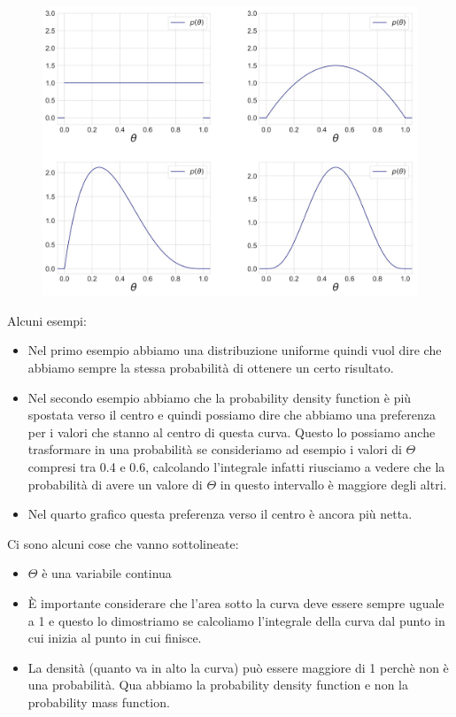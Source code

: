 \documentclass[14pt]{extreport}
\begin{document}
\begin{figure}[H]
\centering
\includegraphics[width=0.7\linewidth]{29.jpeg}
\end{figure}

Alcuni esempi:
\begin{itemize}
\item Nel primo esempio abbiamo una distribuzione uniforme quindi vuol dire che abbiamo sempre la stessa probabilità di ottenere un certo risultato.
\item Nel secondo esempio abbiamo che la probability density function è più spostata verso il centro e quindi possiamo dire che abbiamo una preferenza
per i valori che stanno al centro di questa curva. Questo lo possiamo anche trasformare in una probabilità se consideriamo ad esempio i valori di
$\Theta$ compresi tra 0.4 e 0.6, calcolando l'integrale infatti riusciamo a vedere che la probabilità di avere un valore di $\Theta$ in questo
intervallo è maggiore degli altri.
\item Nel quarto grafico questa preferenza verso il centro è ancora più netta.
\end{itemize}

Ci sono alcuni cose che vanno sottolineate:
\begin{itemize}
\item $\Theta$ è una variabile continua
\item È importante considerare che l'area sotto la curva deve essere sempre uguale a 1 e questo lo dimostriamo se calcoliamo l'integrale della curva
dal punto in cui inizia al punto in cui finisce.
\item La densità (quanto va in alto la curva) può essere maggiore di 1 perchè non è una probabilità. Qua abbiamo la probability density function e non
la probability mass function.
\end{itemize}
\end{document}
